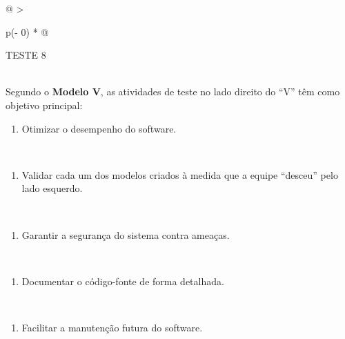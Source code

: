 \documentclass[
]{book}
\providecommand{\tightlist}{%
  \setlength{\itemsep}{0pt}\setlength{\parskip}{0pt}}
\begin{document}
\begin{longtable}[]{@{}
  >{\raggedright\arraybackslash}p{(\columnwidth - 0\tabcolsep) * }@{}}
\toprule\noalign{}
\begin{minipage}[b]{\linewidth}\raggedright
TESTE 8
\end{minipage} \\
\midrule\noalign{}
\endhead
\bottomrule\noalign{}
\endlastfoot
Segundo o \textbf{Modelo V}, as atividades de teste no lado direito do ``V'' têm como objetivo principal: \\
\begin{minipage}[t]{\linewidth}\raggedright
\begin{enumerate}
\def\labelenumi{\Alph{enumi})}
\tightlist
\item
  Otimizar o desempenho do software.
\end{enumerate}
\end{minipage} \\
\begin{minipage}[t]{\linewidth}\raggedright
\begin{enumerate}
\def\labelenumi{\Alph{enumi})}
\setcounter{enumi}{1}
\tightlist
\item
  Validar cada um dos modelos criados à medida que a equipe ``desceu'' pelo lado esquerdo.
\end{enumerate}
\end{minipage} \\
\begin{minipage}[t]{\linewidth}\raggedright
\begin{enumerate}
\def\labelenumi{\Alph{enumi})}
\setcounter{enumi}{2}
\tightlist
\item
  Garantir a segurança do sistema contra ameaças.
\end{enumerate}
\end{minipage} \\
\begin{minipage}[t]{\linewidth}\raggedright
\begin{enumerate}
\def\labelenumi{\Alph{enumi})}
\setcounter{enumi}{3}
\tightlist
\item
  Documentar o código-fonte de forma detalhada.
\end{enumerate}
\end{minipage} \\
\begin{minipage}[t]{\linewidth}\raggedright
\begin{enumerate}
\def\labelenumi{\Alph{enumi})}
\setcounter{enumi}{4}
\tightlist
\item
  Facilitar a manutenção futura do software.
\end{enumerate}
\end{minipage} \\
\end{longtable}
\end{document}
